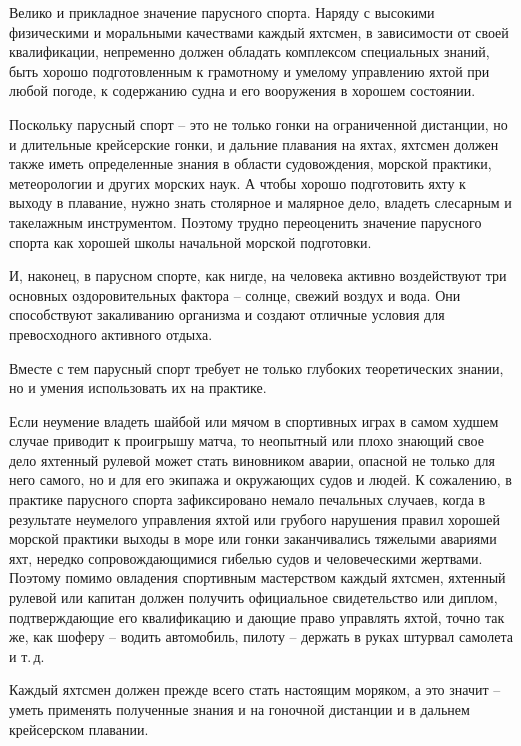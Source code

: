 \documentclass[a4paper, 12pt, twoside, final]{scrbook}
\begin{document}
Велико и прикладное значение парусного спорта. Наряду с высокими физическими
и моральными качествами каждый яхтсмен, в зависимости от своей квалификации,
непременно должен обладать комплексом специальных знаний, быть хорошо
подготовленным к грамотному и умелому управлению яхтой при любой погоде,
к содержанию судна и его вооружения в хорошем состоянии.

Поскольку парусный спорт \--- это не только гонки на ограниченной дистанции,
но и длительные крейсерские гонки, и дальние плавания на яхтах, яхтсмен
должен также иметь определенные знания в области судовождения, морской
практики, метеорологии и других морских наук. А чтобы хорошо подготовить
яхту к выходу в плавание, нужно знать столярное и малярное дело, владеть
слесарным и такелажным инструментом. Поэтому трудно переоценить значение
парусного спорта как хорошей школы начальной морской подготовки.

И, наконец, в парусном спорте, как нигде, на человека активно воздействуют
три основных оздоровительных фактора \--- солнце, свежий воздух и вода.
Они способствуют закаливанию организма и создают отличные условия
для превосходного активного отдыха.

Вместе с тем парусный спорт требует не только глубоких теоретических
знании, но и умения использовать их на практике.

Если неумение владеть шайбой или мячом в спортивных играх в самом
худшем случае приводит к проигрышу матча, то неопытный или плохо знающий
свое дело яхтенный рулевой может стать виновником аварии, опасной
не только для него самого, но и для его экипажа и окружающих судов
и людей. К сожалению, в практике парусного спорта зафиксировано немало
печальных случаев, когда в результате неумелого управления яхтой или
грубого нарушения правил хорошей морской практики выходы в море или
гонки заканчивались тяжелыми авариями яхт, нередко сопровождающимися
гибелью судов и человеческими жертвами. Поэтому помимо овладения спортивным
мастерством каждый яхтсмен, яхтенный рулевой или капитан должен получить
официальное свидетельство или диплом, подтверждающие его квалификацию
и дающие право управлять яхтой, точно так же, как шоферу \--- водить
автомобиль, пилоту \--- держать в руках штурвал самолета и т.\,д.

Каждый яхтсмен должен прежде всего стать настоящим моряком, а это
значит \--- уметь применять полученные знания и на гоночной дистанции
и в дальнем крейсерском плавании.

%
%
\end{document}
